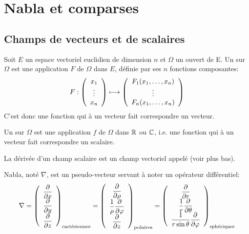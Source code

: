 \medskip
\section{Nabla et comparses}
\subsection{Champs de vecteurs et de scalaires}
\begin{definition}
Soit $E$ un espace vectoriel euclidien
de dimension $n$ et $\Omega$ un ouvert de E.
Un  sur $\Omega$ est une application $F$ de $\Omega$ dans $E$,
définie par ses $n$ fonctions composantes:
\begin{equation}
    F : \left( \begin{array}{c}x_1\\\vdots\\x_n\end{array}\right) \longmapsto \left( \begin{array}{c} F_1(x_1,\dots,x_n)\\ \vdots\\ F_n(x_1,\dots,x_n)\end{array}\right)
\end{equation}
C'est donc une fonction qui à un vecteur fait correspondre un vecteur.
\end{definition}
\medskip
\begin{definition}
Un  sur $\Omega$ est une application $f$ de $\Omega$ dans $\mathbb R$ ou $\mathbb C$,
i.e. une fonction qui à un vecteur fait correspondre un scalaire.
\end{definition}
La dérivée d'un champ scalaire est un champ vectoriel appelé  (voir plus bas).

\medskip
{} Nabla, noté $\nabla$, est un pseudo-vecteur  servant à noter un opérateur
différentiel:
\begin{equation}
\nabla  = \left( \begin{array}{c} {\dfrac\partial{\partial x}}\\ \dfrac\partial{\partial y}\\ \dfrac\partial{\partial z}
\end{array}\right)_{\text{cartésiennes}}
= \left( \begin{array}{c} \dfrac\partial{\partial \rho}\\ \dfrac1\rho \dfrac\partial{\partial \varphi}\\ \dfrac\partial{\partial z}
\end{array}\right)_{\text{polaires}}
= \left( \begin{array}{c} \dfrac\partial{\partial r}\\ \dfrac1r \dfrac\partial{\partial \theta}\\\dfrac1{r\sin\theta} \dfrac\partial{\partial \varphi}
\end{array}\right)_{\text{sphériques}}
\end{equation}

